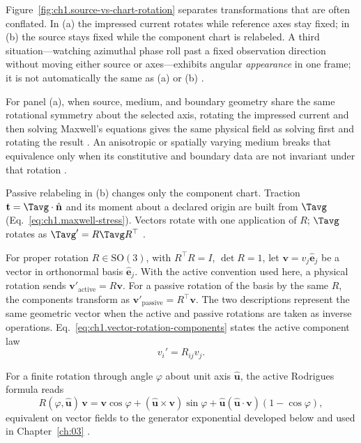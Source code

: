 Figure~\ref{fig:ch1.source-vs-chart-rotation} separates transformations that are often conflated. In (a) the impressed current rotates while reference axes stay fixed; in (b) the source stays fixed while the component chart is relabeled. A third situation---watching azimuthal phase roll past a fixed observation direction without moving either source or axes---exhibits angular \emph{appearance} in one frame; it is not automatically the same as (a) or (b) \cite{hansen1988}.

For panel (a), when source, medium, and boundary geometry share the same rotational symmetry about the selected axis, rotating the impressed current and then solving Maxwell's equations gives the same physical field as solving first and rotating the result \cite{stratton1941,hansen1988}. An anisotropic or spatially varying medium breaks that equivalence only when its constitutive and boundary data are not invariant under that rotation \cite{stratton1941}.

Passive relabeling in (b) changes only the component chart. Traction $\mathbf{t}=\Tavg\cdot\hat{\mathbf{n}}$ and its moment about a declared origin are built from $\Tavg$ (Eq.~\eqref{eq:ch1.maxwell-stress}). Vectors rotate with one application of $R$; $\Tavg$ rotates as $\Tavg'=R\Tavg R^\top$ \cite{beth1936,stratton1941}.

For proper rotation \(R\in\mathrm{SO}(3)\), with \(R^\top R=I\), \(\det R=1\), let
\(\mathbf{v}=v_j\hat{\mathbf{e}}_j\) be a vector in orthonormal basis
\(\hat{\mathbf{e}}_j\). With the active convention used here, a physical rotation sends $\mathbf{v}'_{\mathrm{active}}=R\mathbf{v}$. For a passive rotation of the basis by the same $R$, the components transform as $\mathbf{v}'_{\mathrm{passive}}=R^\top\mathbf{v}$. The two descriptions represent the same geometric vector when the active and passive rotations are taken as inverse operations. Eq.~\eqref{eq:ch1.vector-rotation-components} states the active component law
\begin{equation}
\label{eq:ch1.infinitesimal-active-rotation}v_i' = R_{ij}v_j.
\end{equation}
\addtocounter{equation}{-1}\label{eq:ch1.vector-rotation-components}%
\addtocounter{equation}{-1}\label{eq:ch1.active-rotation-action}%
For a finite rotation through angle \(\varphi\) about unit axis \(\hat{\mathbf{u}}\), the active Rodrigues formula reads
\begin{equation}
\label{eq:ch1.rodrigues-rotation}
R(\varphi,\hat{\mathbf{u}})\,\mathbf{v}
=
\mathbf{v}\cos\varphi
+(\hat{\mathbf{u}}\times\mathbf{v})\sin\varphi
+\hat{\mathbf{u}}(\hat{\mathbf{u}}\cdot\mathbf{v})(1-\cos\varphi),
\end{equation}
equivalent on vector fields to the generator exponential developed below and used in Chapter~\ref{ch:03} \cite{jackson1999,stratton1941}.

